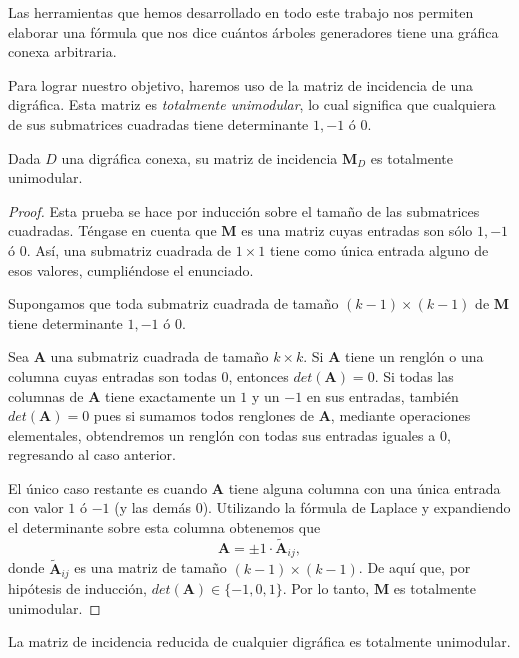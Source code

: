 Las herramientas que hemos desarrollado en todo este trabajo nos permiten elaborar una fórmula que nos dice cuántos árboles generadores tiene una gráfica conexa arbitraria. 

Para lograr nuestro objetivo, haremos uso de la matriz de incidencia de una digráfica. Esta matriz es \textit{totalmente unimodular}, lo cual significa que cualquiera de sus submatrices cuadradas tiene determinante $1, -1$ ó $0$.

\begin{teo} \label{teo:totalmenteunimodular}
Dada $D$ una digráfica conexa, su matriz de incidencia $\mathbf{M}_{D}$ es totalmente unimodular.
\end{teo}

\begin{proof} Esta prueba se hace por inducción sobre el tamaño de las submatrices cuadradas. Téngase en cuenta que $\mathbf{M}$ es una matriz cuyas entradas son sólo $1, -1$ ó $0$. Así, una submatriz cuadrada de $1 \times 1$ tiene como única entrada alguno de esos valores, cumpliéndose el enunciado.

Supongamos que toda submatriz cuadrada de tamaño $(k-1) \times (k-1)$ de $\mathbf{M}$ tiene determinante $1, -1$ ó $0$. 

Sea $\textbf{A}$ una submatriz cuadrada de tamaño $k \times k$. Si $\textbf{A}$ tiene un renglón o una columna cuyas entradas son todas $0$, entonces $det(\textbf{A}) = 0$. Si todas las columnas de $\textbf{A}$ tiene exactamente un $1$ y un $-1$ en sus entradas, también $det(\textbf{A}) = 0$ pues si sumamos todos renglones de $\textbf{A}$, mediante operaciones elementales, obtendremos un renglón con todas sus entradas iguales a $0$, regresando al caso anterior.

El único caso restante es cuando $\textbf{A}$ tiene alguna columna con una única entrada con valor $1$ ó $-1$ (y las demás $0$). Utilizando la fórmula de Laplace y expandiendo el determinante sobre esta columna obtenemos que $$\textbf{A} = \pm 1 \cdot\widetilde{\textbf{A}}_{ij},$$ donde $\widetilde{\textbf{A}}_{ij}$ es una matriz de tamaño $(k-1) \times (k-1)$. De aquí que, por hipótesis de inducción, $det(\textbf{A}) \in \{-1, 0,1\}$. Por lo tanto, $\mathbf{M}$ es totalmente unimodular.

\end{proof}

\begin{cor}
La matriz de incidencia reducida de cualquier digráfica es totalmente unimodular.
\end{cor}

